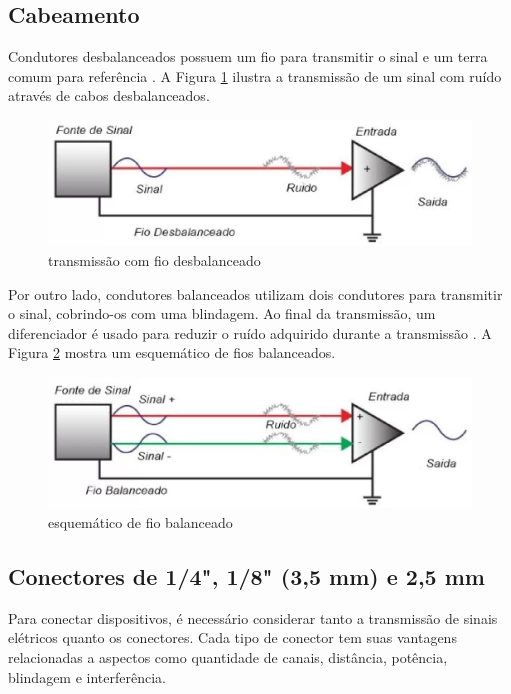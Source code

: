 \subsection{Cabeamento}

Condutores desbalanceados possuem um fio para transmitir o sinal e um terra comum para referência \cite{bartlett}. A Figura \ref{fig12} ilustra a transmissão de um sinal com ruído através de cabos desbalanceados.

\begin{figure}[h]
	\centering
    \includegraphics[scale=0.4]{figuras/fig11.eps}
	\caption{transmissão com fio desbalanceado \cite{proaudiospQualDiferena}}
	\label{fig12}
\end{figure}

Por outro lado, condutores balanceados utilizam dois condutores para transmitir o sinal, cobrindo-os com uma blindagem. Ao final da transmissão, um diferenciador é usado para reduzir o ruído adquirido durante a transmissão \cite{bartlett}. A Figura \ref{fig11} mostra um esquemático de fios balanceados.

\begin{figure}[h]
	\centering
    \includegraphics[scale=0.4]{figuras/fig12.eps}
	\caption{esquemático de fio balanceado \cite{proaudiospQualDiferena}}
	\label{fig11}
\end{figure}

\subsection{Conectores de 1/4", 1/8" (3,5 mm) e 2,5 mm}

Para conectar dispositivos, é necessário considerar tanto a transmissão de sinais elétricos quanto os conectores. Cada tipo de conector tem suas vantagens relacionadas a aspectos como quantidade de canais, distância, potência, blindagem e interferência.

